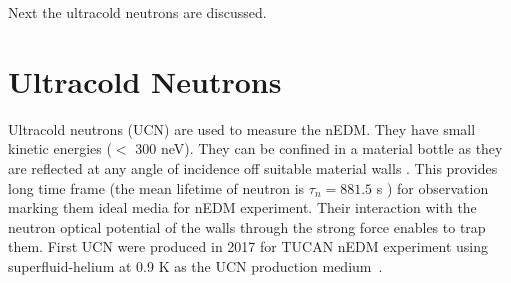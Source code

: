 

Next the ultracold neutrons are discussed.

\section{Ultracold Neutrons}
Ultracold neutrons (UCN) are used to measure the nEDM. They have small kinetic energies ($<$ 300 neV). They can be confined in a material bottle as they are reflected at any angle of incidence off suitable material walls \cite{ucn_storage}. This provides long time frame (the mean lifetime of neutron is $\tau_n=881.5$ s \cite{mike}) for observation marking them ideal media for nEDM experiment. Their interaction with the neutron optical potential of the walls through the strong force enables to trap them. First UCN were produced in 2017 for TUCAN nEDM experiment using superfluid-helium at 0.9 K as the UCN production medium~\cite{TRIUMF_UCN,taraneh_theis}.

